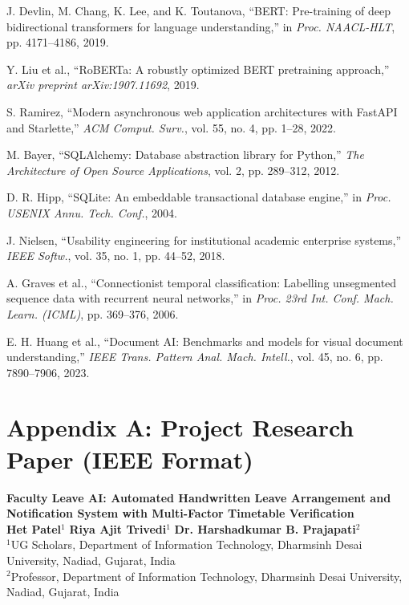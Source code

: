 \documentclass[12pt,letterpaper]{report}
\begin{document}
\begin{enumerate}[label={[\arabic*]}, leftmargin=2.5em]
    \item J. Devlin, M. Chang, K. Lee, and K. Toutanova, ``BERT: Pre-training of deep bidirectional transformers for language understanding,'' in \textit{Proc. NAACL-HLT}, pp. 4171--4186, 2019.
    \item Y. Liu et al., ``RoBERTa: A robustly optimized BERT pretraining approach,'' \textit{arXiv preprint arXiv:1907.11692}, 2019.
    \item S. Ramirez, ``Modern asynchronous web application architectures with FastAPI and Starlette,'' \textit{ACM Comput. Surv.}, vol. 55, no. 4, pp. 1--28, 2022.
    \item M. Bayer, ``SQLAlchemy: Database abstraction library for Python,'' \textit{The Architecture of Open Source Applications}, vol. 2, pp. 289--312, 2012.
    \item D. R. Hipp, ``SQLite: An embeddable transactional database engine,'' in \textit{Proc. USENIX Annu. Tech. Conf.}, 2004.
    \item J. Nielsen, ``Usability engineering for institutional academic enterprise systems,'' \textit{IEEE Softw.}, vol. 35, no. 1, pp. 44--52, 2018.
    \item A. Graves et al., ``Connectionist temporal classification: Labelling unsegmented sequence data with recurrent neural networks,'' in \textit{Proc. 23rd Int. Conf. Mach. Learn. (ICML)}, pp. 369--376, 2006.
    \item E. H. Huang et al., ``Document AI: Benchmarks and models for visual document understanding,'' \textit{IEEE Trans. Pattern Anal. Mach. Intell.}, vol. 45, no. 6, pp. 7890--7906, 2023.
\end{enumerate}

\chapter*{Appendix A: Project Research Paper (IEEE Format)}

\begin{center}
    {\Large \textbf{Faculty Leave AI: Automated Handwritten Leave Arrangement and Notification System with Multi-Factor Timetable Verification}}\\[0.4cm]
    \textbf{Het Patel}$^1$ \quad \textbf{Riya Ajit Trivedi}$^1$ \quad \textbf{Dr. Harshadkumar B. Prajapati}$^2$\\[0.2cm]
    $^1$UG Scholars, Department of Information Technology, Dharmsinh Desai University, Nadiad, Gujarat, India\\
    $^2$Professor, Department of Information Technology, Dharmsinh Desai University, Nadiad, Gujarat, India\\[0.6cm]
\end{center}
\end{document}
